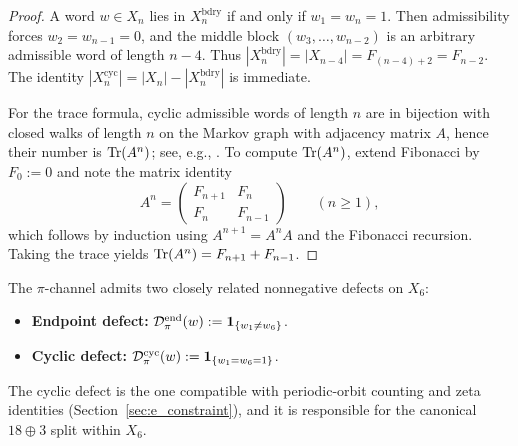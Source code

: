 \begin{proof}
A word $w\in X_n$ lies in $X_n^{\mathrm{bdry}}$ if and only if $w_1=w_n=1$.
Then admissibility forces $w_2=w_{n-1}=0$, and the middle block $(w_3,\dots,w_{n-2})$ is an arbitrary admissible word of length $n-4$.
Thus $|X_n^{\mathrm{bdry}}|=|X_{n-4}|=F_{(n-4)+2}=F_{n-2}$.
The identity $|X_n^{\mathrm{cyc}}|=|X_n|-|X_n^{\mathrm{bdry}}|$ is immediate.

For the trace formula, cyclic admissible words of length $n$ are in bijection with closed walks of length $n$ on the Markov graph with adjacency matrix $A$, hence their number is $\mathrm{Tr}(A^n)$; see, e.g., \cite{LindMarcus1995}.
To compute $\mathrm{Tr}(A^n)$, extend Fibonacci by $F_0:=0$ and note the matrix identity
\[
A^n=\begin{pmatrix}F_{n+1} & F_n\\[2pt] F_n & F_{n-1}\end{pmatrix}
\qquad (n\ge 1),
\]
which follows by induction using $A^{n+1}=A^n A$ and the Fibonacci recursion.
Taking the trace yields $\mathrm{Tr}(A^n)=F_{n+1}+F_{n-1}$.
\end{proof}

\begin{remark}
The $\pi$-channel admits two closely related nonnegative defects on $X_6$:
\begin{itemize}
\item \textbf{Endpoint defect:} $\mathcal{D}_\pi^{\mathrm{end}}(w):=\mathbf{1}_{\{w_1\neq w_6\}}$.
\item \textbf{Cyclic defect:} $\mathcal{D}_\pi^{\mathrm{cyc}}(w):=\mathbf{1}_{\{w_1=w_6=1\}}$.
\end{itemize}
The cyclic defect is the one compatible with periodic-orbit counting and zeta identities (Section~\ref{sec:e_constraint}), and it is responsible for the canonical $18\oplus 3$ split within $X_6$.
\end{remark}



